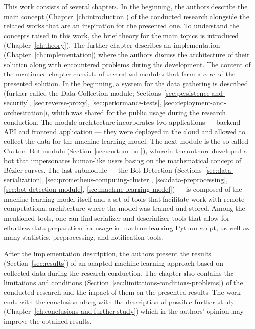 This work consists of several chapters.
In the beginning, the authors describe the main concept (Chapter~\ref{ch:introduction}) of the conducted research alongside the related works that are an inspiration for the presented one.
To understand the concepts raised in this work, the brief theory for the main topics is introduced (Chapter~\ref{ch:theory}).
The further chapter describes an implementation (Chapter~\ref{ch:implementation}) where the authors discuss the architecture of their solution along with encountered problems during the development.
The content of the mentioned chapter consists of several submodules that form a core of the presented solution.
In the beginning, a system for the data gathering is described (further called the Data Collection module; Sections~\ref{sec:persistence-and-security}, \ref{sec:reverse-proxy}, \ref{sec:performance-tests}, \ref{sec:deployment-and-orchestration}), which was shared for the public usage during the research conduction.
The module architecture incorporates two applications --- backend API and frontend application --- they were deployed in the cloud and allowed to collect the data for the machine learning model.
The next module is the so-called Custom Bot module (Section~\ref{sec:custom-bot}), wherein the authors developed a bot that impersonates human-like users basing on the mathematical concept of Bézier curves.
The last submodule --- the Bot Detection (Sections~\ref{sec:data-serialization}, \ref{sec:prometheus-computing-cluster}, \ref{sec:data-preprocessing}, \ref{sec:bot-detection-module}, \ref{sec:machine-learning-model}) --- is composed of the machine learning model itself and a set of tools that facilitate work with remote computational architecture where the model was trained and stored.
Among the mentioned tools, one can find serializer and deserializer tools that allow for effortless data preparation for usage in machine learning Python script, as well as many statistics, preprocessing, and notification tools.

After the implementation description, the authors present the results (Section~\ref{sec:results}) of an adapted machine learning approach based on collected data during the research conduction.
The chapter also contains the limitations and conditions (Section~\ref{sec:limitations-conditions-problems}) of the conducted research and the impact of them on the presented results.
The work ends with the conclusion along with the description of possible further study (Chapter~\ref{ch:conclusions-and-further-study}) which in the authors' opinion may improve the obtained results.